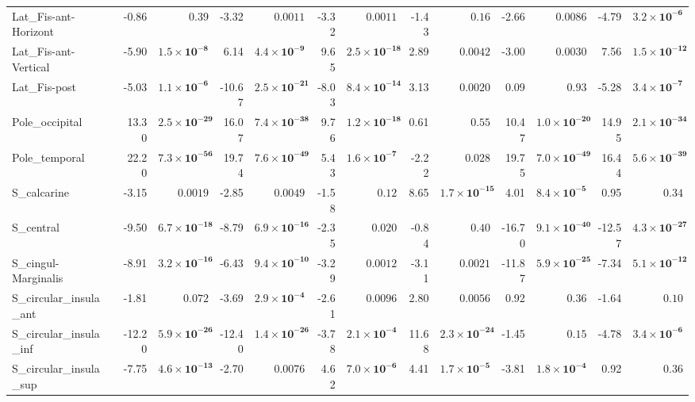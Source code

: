 {\begin{longtable}{llrrrrrrrrrrrr}
Lat\_Fis-ant-Horizont &  & -0.86 & $0.39$ & -3.32 & $0.0011$ & -3.32 & $0.0011$ & -1.43 & $0.16$ & -2.66 & $0.0086$ & -4.79 & $\mathbf{3.2{\times}10^{-6}}$ \\
Lat\_Fis-ant-Vertical &  & -5.90 & $\mathbf{1.5{\times}10^{-8}}$ & 6.14 & $\mathbf{4.4{\times}10^{-9}}$ & 9.65 & $\mathbf{2.5{\times}10^{-18}}$ & 2.89 & $0.0042$ & -3.00 & $0.0030$ & 7.56 & $\mathbf{1.5{\times}10^{-12}}$ \\
Lat\_Fis-post &  & -5.03 & $\mathbf{1.1{\times}10^{-6}}$ & -10.67 & $\mathbf{2.5{\times}10^{-21}}$ & -8.03 & $\mathbf{8.4{\times}10^{-14}}$ & 3.13 & $0.0020$ & 0.09 & $0.93$ & -5.28 & $\mathbf{3.4{\times}10^{-7}}$ \\
Pole\_occipital &  & 13.30 & $\mathbf{2.5{\times}10^{-29}}$ & 16.07 & $\mathbf{7.4{\times}10^{-38}}$ & 9.76 & $\mathbf{1.2{\times}10^{-18}}$ & 0.61 & $0.55$ & 10.47 & $\mathbf{1.0{\times}10^{-20}}$ & 14.95 & $\mathbf{2.1{\times}10^{-34}}$ \\
Pole\_temporal &  & 22.20 & $\mathbf{7.3{\times}10^{-56}}$ & 19.74 & $\mathbf{7.6{\times}10^{-49}}$ & 5.43 & $\mathbf{1.6{\times}10^{-7}}$ & -2.22 & $0.028$ & 19.75 & $\mathbf{7.0{\times}10^{-49}}$ & 16.44 & $\mathbf{5.6{\times}10^{-39}}$ \\
S\_calcarine &  & -3.15 & $0.0019$ & -2.85 & $0.0049$ & -1.58 & $0.12$ & 8.65 & $\mathbf{1.7{\times}10^{-15}}$ & 4.01 & $\mathbf{8.4{\times}10^{-5}}$ & 0.95 & $0.34$ \\
S\_central &  & -9.50 & $\mathbf{6.7{\times}10^{-18}}$ & -8.79 & $\mathbf{6.9{\times}10^{-16}}$ & -2.35 & $0.020$ & -0.84 & $0.40$ & -16.70 & $\mathbf{9.1{\times}10^{-40}}$ & -12.57 & $\mathbf{4.3{\times}10^{-27}}$ \\
S\_cingul-Marginalis &  & -8.91 & $\mathbf{3.2{\times}10^{-16}}$ & -6.43 & $\mathbf{9.4{\times}10^{-10}}$ & -3.29 & $0.0012$ & -3.11 & $0.0021$ & -11.87 & $\mathbf{5.9{\times}10^{-25}}$ & -7.34 & $\mathbf{5.1{\times}10^{-12}}$ \\
S\_circular\_insula\_ant &  & -1.81 & $0.072$ & -3.69 & $\mathbf{2.9{\times}10^{-4}}$ & -2.61 & $0.0096$ & 2.80 & $0.0056$ & 0.92 & $0.36$ & -1.64 & $0.10$ \\
S\_circular\_insula\_inf &  & -12.20 & $\mathbf{5.9{\times}10^{-26}}$ & -12.40 & $\mathbf{1.4{\times}10^{-26}}$ & -3.78 & $\mathbf{2.1{\times}10^{-4}}$ & 11.68 & $\mathbf{2.3{\times}10^{-24}}$ & -1.45 & $0.15$ & -4.78 & $\mathbf{3.4{\times}10^{-6}}$ \\
S\_circular\_insula\_sup &  & -7.75 & $\mathbf{4.6{\times}10^{-13}}$ & -2.70 & $0.0076$ & 4.62 & $\mathbf{7.0{\times}10^{-6}}$ & 4.41 & $\mathbf{1.7{\times}10^{-5}}$ & -3.81 & $\mathbf{1.8{\times}10^{-4}}$ & 0.92 & $0.36$ \\

\end{longtable}}
